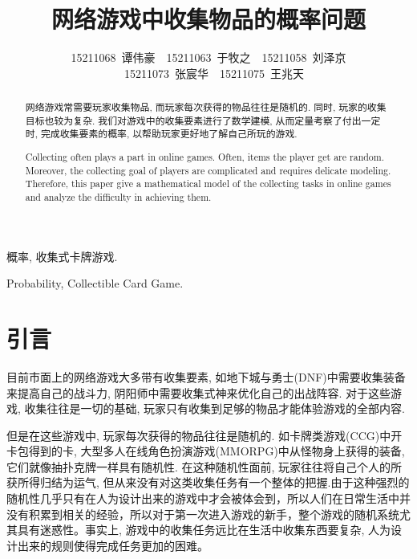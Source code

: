\documentclass[10pt,journal,compsoc]{IEEEtran}
\begin{document}
\title{网络游戏中收集物品的概率问题}

\author{15211068~谭伟豪~~15211063~于牧之~~15211058~刘泽京\\ ~~15211073~张宸华~~15211075~王兆天}

\maketitle

\newtheorem{definition}{Definition}
\renewcommand{\abstractname}{摘 要}
\renewcommand{\figurename}{图}
\renewcommand{\tablename}{表}
\renewcommand{\IEEEkeywordsname}{关键词}
\begin{abstract}

  网络游戏常需要玩家收集物品, 而玩家每次获得的物品往往是随机的. 同时, 玩家的收集目标也较为复杂. 我们对游戏中的收集要素进行了数学建模, 从而定量考察了付出一定时, 完成收集要素的概率, 以帮助玩家更好地了解自己所玩的游戏.

\end{abstract}
\renewcommand{\abstractname}{Abstract}
\begin{abstract}
  Collecting often plays a part in online games. Often, items the player get are random. Moreover, the collecting goal of players are complicated and requires delicate modeling. Therefore, this paper give a mathematical model of the collecting tasks in online games and analyze the difficulty in achieving them.
\end{abstract}

\begin{IEEEkeywords}
概率, 收集式卡牌游戏.
\end{IEEEkeywords}
\renewcommand{\IEEEkeywordsname}{Keywords}
\begin{IEEEkeywords}
Probability, Collectible Card Game.
\end{IEEEkeywords}

\section{引言}

  目前市面上的网络游戏大多带有收集要素, 如地下城与勇士(DNF)中需要收集装备来提高自己的战斗力, 阴阳师中需要收集式神来优化自己的出战阵容. 对于这些游戏, 收集往往是一切的基础, 玩家只有收集到足够的物品才能体验游戏的全部内容.

  但是在这些游戏中, 玩家每次获得的物品往往是随机的. 如卡牌类游戏(CCG)中开卡包得到的卡, 大型多人在线角色扮演游戏(MMORPG)中从怪物身上获得的装备, 它们就像抽扑克牌一样具有随机性. 在这种随机性面前, 玩家往往将自己个人的所获所得归结为运气, 但从来没有对这类收集任务有一个整体的把握.由于这种强烈的随机性几乎只有在人为设计出来的游戏中才会被体会到，所以人们在日常生活中并没有积累到相关的经验，所以对于第一次进入游戏的新手，整个游戏的随机系统尤其具有迷惑性。事实上, 游戏中的收集任务远比在生活中收集东西要复杂, 人为设计出来的规则使得完成任务更加的困难。
\end{document}
